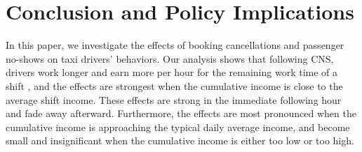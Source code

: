 \documentclass[reviewmode,AEJ]{AEA}
\begin{document}


\section{Conclusion and Policy Implications}
\label{sec:conclude}
In this paper, we investigate the effects of booking cancellations and passenger no-shows on taxi 
drivers' behaviors. Our analysis shows that following CNS, drivers work longer and earn more per hour
for the remaining work time of a shift%
, and the effects are strongest when the cumulative income is close to the average shift income. 
These effects are strong in the immediate following hour and fade away afterward. Furthermore, the effects are most pronounced when the cumulative income is approaching the typical daily average income, and become small and insignificant when the cumulative income is either too low or too high.
\end{document}
